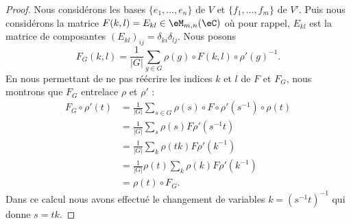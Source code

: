 \begin{proof}
    Nous considérons les bases \( \{ e_1,\ldots, e_n \} \) de \( V\) et \( \{ f_1,\ldots, f_m \}\) de \( V'\). Puis nous considérons la matrice $F(k,l)=E_{kl}\in\eM_{m,n}(\eC)$ où pour rappel, \( E_{kl}\) est la matrice de composantes \( (E_{kl})_{ij}=\delta_{ki}\delta_{lj}\). Nous posons
    \begin{equation}
        F_G(k,l)=\frac{1}{ | G | }\sum_{g\in G}\rho(g)\circ F(k,l)\circ\rho'(g)^{-1}.
    \end{equation}
    En nous permettant de ne pas réécrire les indices \( k\) et \(l \) de \( F\) et \( F_G\), nous montrons que \( F_G\) entrelace \( \rho\) et \( \rho'\) :
    \begin{subequations}
        \begin{align}
            F_G\circ\rho'(t)&=\frac{1}{ | G | }\sum_{s\in G}\rho(s)\circ F\circ \rho'(s^{-1})\circ \rho(t)\\
            &=\frac{1}{ | G | }\sum_s\rho(s)F\rho'(s^{-1} t)\\
            &=\frac{1}{ | G | }\sum_{k}\rho(tk)F\rho'(k^{-1})\\
            &=\frac{1}{ | G | }\rho(t) \sum_k\rho(k)F\rho'(k^{-1})\\
            &=\rho(t)\circ F_G.
        \end{align}
    \end{subequations}
    Dans ce calcul nous avons effectué le changement de variables \( k=(s^{-1} t)^{-1}\) qui donne \( s=tk\).


\end{proof}
